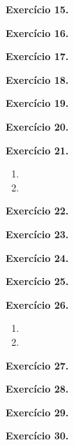 \documentclass[12pt,a4paper]{article}
\begin{document}
\vspace{0.5cm}
\noindent\textbf{Exercício 15.}

\vspace{0.5cm}
\noindent\textbf{Exercício 16.}

\vspace{0.5cm}
\noindent\textbf{Exercício 17.}

\vspace{0.5cm}
\noindent\textbf{Exercício 18.}

\vspace{0.5cm}
\noindent\textbf{Exercício 19.}

\vspace{0.5cm}
\noindent\textbf{Exercício 20.}

\vspace{0.5cm}
\noindent\textbf{Exercício 21.}
\begin{enumerate}
    \renewcommand{\theenumi}{\alph{enumi}}
    \renewcommand{\labelenumi}{\theenumi)}
    \item 
    \item 
\end{enumerate}

\vspace{0.5cm}
\noindent\textbf{Exercício 22.}

\vspace{0.5cm}
\noindent\textbf{Exercício 23.}

\vspace{0.5cm}
\noindent\textbf{Exercício 24.}

\vspace{0.5cm}
\noindent\textbf{Exercício 25.}

\vspace{0.5cm}
\noindent\textbf{Exercício 26.}
\begin{enumerate}
    \renewcommand{\theenumi}{\alph{enumi}}
    \renewcommand{\labelenumi}{\theenumi)}
    \item 
    \item 
\end{enumerate}

\vspace{0.5cm}
\noindent\textbf{Exercício 27.}

\vspace{0.5cm}
\noindent\textbf{Exercício 28.}

\vspace{0.5cm}
\noindent\textbf{Exercício 29.}

\vspace{0.5cm}
\noindent\textbf{Exercício 30.}
\end{document}
